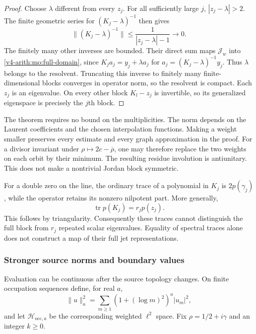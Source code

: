 \begin{proof}
Choose $\lambda$ different from every $z_j$. For all sufficiently
large $j$, $|z_j-\lambda|>2$. The finite geometric series for
$(K_j-\lambda)^{-1}$ then gives
\[
 \|(K_j-\lambda)^{-1}\|
 \leq\frac1{|z_j-\lambda|-1}\longrightarrow0.
\]
The finitely many other inverses are bounded. Their direct sum
maps $\mathscr J_w$ into \eqref{v4-arith:mo:full-domain}, since
$K_ja_j=y_j+\lambda a_j$ for
$a_j=(K_j-\lambda)^{-1}y_j$.
Thus $\lambda$ belongs to the resolvent. Truncating this inverse
to finitely many finite-dimensional blocks converges in operator
norm, so the resolvent is compact. Each $z_j$ is an eigenvalue.
On every other block $K_l-z_j$ is invertible, so its generalized
eigenspace is precisely the $j$th block.
\end{proof}

The theorem requires no bound on the multiplicities. The norm
depends on the Laurent coefficients and the chosen interpolation
functions. Making a weight smaller preserves every estimate and
every graph approximation in the proof. For a divisor invariant
under $\rho\mapsto2c-\overline\rho$, one may therefore replace
the two weights on each orbit by their minimum. The resulting
residue involution is antiunitary. This does not make a nontrivial
Jordan block symmetric.

For a double zero on the line, the ordinary trace of a polynomial
in $K_j$ is $2p(\gamma_j)$, while the operator retains its
nonzero nilpotent part. More generally,
\[
 \operatorname{tr}p(K_j)=r_jp(z_j).
\]
This follows by triangularity. Consequently these traces cannot
distinguish the full block from $r_j$ repeated scalar eigenvalues.
Equality of spectral traces alone does not construct a map of
their full jet representations.


\subsubsection{Stronger source norms and boundary values}

Evaluation can be continuous after the source topology changes.
On finite occupation sequences define, for real $a$,
\[
 \|u\|_a^2=\sum_{m\geq1}(1+(\log m)^2)^a|u_m|^2,
\]
and let $\mathscr H_{\mathrm{occ},a}$ be the corresponding weighted
$\ell^2$ space. Fix $\rho=1/2+i\gamma$ and an integer $k\geq0$.

